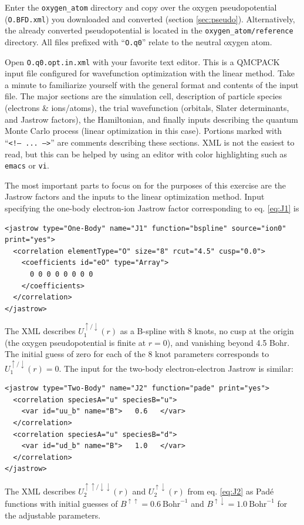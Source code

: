Enter the \texttt{oxygen\_atom} directory and copy over the oxygen pseudopotential (\texttt{O.BFD.xml}) you downloaded and converted (section \ref{sec:pseudo}).  Alternatively, the already converted pseudopotential is located in the \texttt{oxygen\_atom/reference} directory.  All files prefixed with ``\texttt{O.q0}'' relate to the neutral oxygen atom.  

Open \texttt{O.q0.opt.in.xml} with your favorite text editor.  This is a QMCPACK input file configured for wavefunction optimization with the linear method. Take a minute to familiarize yourself with the general format and contents of the input file.  The major sections are the simulation cell, description of particle species (electrons \& ions/atoms), the trial wavefunction (orbitals, Slater determinants, and Jastrow factors), the Hamiltonian, and finally inputs describing the quantum Monte Carlo process (linear optimization in this case).  Portions marked with ``\texttt{<!-- ... -->}'' are comments describing these sections.  XML is not the easiest to read, but this can be helped by using an editor with color highlighting such as \texttt{emacs} or \texttt{vi}.

The most important parts to focus on for the purposes of this exercise are the Jastrow factors and the inputs to the linear optimization method.  Input specifying the one-body electron-ion Jastrow factor corresponding to eq. \ref{eq:J1} is 
\begin{shaded}
\begin{verbatim}
<jastrow type="One-Body" name="J1" function="bspline" source="ion0" print="yes">  
  <correlation elementType="O" size="8" rcut="4.5" cusp="0.0">
    <coefficients id="eO" type="Array">                  
      0 0 0 0 0 0 0 0    
    </coefficients>
  </correlation>
</jastrow>
\end{verbatim}
\end{shaded}
\noindent
The XML describes $U_1^{\uparrow/\downarrow}(r)$ as a B-spline with 8 knots, no cusp at the origin (the oxygen pseudopotential is finite at $r=0$), and vanishing beyond 4.5 Bohr.  The initial guess of zero for each of the 8 knot parameters corresponds to $U_1^{\uparrow/\downarrow}(r)=0$.  The input for the two-body electron-electron Jastrow is similar:
\begin{shaded}
\begin{verbatim}
<jastrow type="Two-Body" name="J2" function="pade" print="yes">
  <correlation speciesA="u" speciesB="u">
    <var id="uu_b" name="B">   0.6   </var>
  </correlation>
  <correlation speciesA="u" speciesB="d">
    <var id="ud_b" name="B">   1.0   </var>  
  </correlation>
</jastrow>
\end{verbatim}
\end{shaded}
\noindent
The XML describes $U_2^{\uparrow\uparrow/\downarrow\downarrow}(r)$ and  $U_2^{\uparrow\downarrow}(r)$ from eq. \ref{eq:J2} as Pad\'{e} functions with initial guesses of $B^{\uparrow\uparrow}=0.6~\textrm{Bohr}^{-1}$ and  $B^{\uparrow\downarrow}=1.0~\textrm{Bohr}^{-1}$ for the adjustable parameters.  

